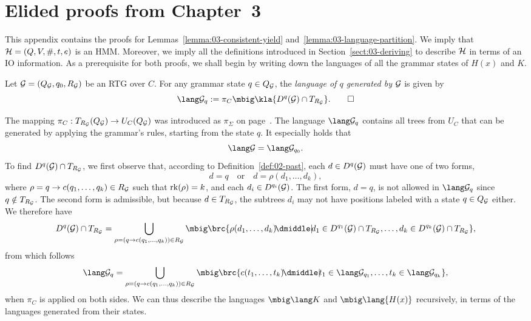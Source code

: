 \section{Elided proofs from Chapter~3}\label{sec:appendix-hk-proofs}

This appendix contains the proofs for Lemmas~\ref{lemma:03-consistent-yield}
and~\ref{lemma:03-language-partition}. We imply that $\mathcal H = (Q,V,\#,t,e)$ is an
HMM. Moreover, we imply all the definitions introduced in
Section~\ref{sect:03-deriving} to describe $\mathcal H$ in terms of an IO information.
As a prerequisite for both proofs, we shall begin by writing down the languages
of all the grammar states of $H(x)$ and $K$.

\begin{definition}
 Let $\mathcal G = (Q_\mathcal G,q_0,R_\mathcal G)$ be an RTG over $C$. For any grammar state $q\in
 Q_\mathcal G$, the \emph{language of $q$ generated by $\mathcal G$} is given by
 \[
  \lang\ug_q := \pi_C\mbig\kla{D^q(\ug)\cap T_{R_\ug}}.
  \qedhere
 \]
\end{definition}

The mapping $\pi_C:T_{R_\mathcal G}(Q_\mathcal G)\to U_C(Q_\mathcal G)$ was introduced as $\pi_\Sigma$ on
page~\pageref{def:02-pi-sigma}. The language $\lang\ug_q$ contains all trees
from $U_C$ that can be generated by applying the grammar's rules, starting from
the state $q$. It especially holds that
\begin{equation}\label{eq:a1}
 \lang\ug = \lang\ug_{q_0}.
\end{equation}
To find $D^q(\mathcal G)\cap T_{R_\mathcal G}$, we first observe that, according to
Definition~\ref{def:02-past}, each $d\in D^q(\mathcal G)$ must have one of two forms,
\[
 d = q \quad\text{or}\quad d = \rho(d_1,\ldots,d_k),
\]
where $\rho=q\to c(q_1,\ldots,q_k)\in R_\mathcal G$ such that $\operatorname{rk}(\rho) = k$, and
each $d_i\in D^{q_i}(\mathcal G)$. The first form, $d = q$, is not allowed in
$\lang\ug_q$ since $q\notin T_{R_\mathcal G}$. The second form is admissible, but
because $d\in T_{R_\mathcal G}$, the subtrees $d_i$ may not have positions labeled with
a state $q\in Q_\mathcal G$ either. We therefore have
\[
 D^q(\ug)\cap T_{R_\ug} = \bigcup_{\rho=(q\to c(q_1,\ldots,q_k))\in R_\ug}
 \mbig\brc{\rho(d_1,\ldots,d_k) \!\dmiddle|\! d_1\in D^{q_1}(\ug)\cap T_{R_\ug},\ldots, d_k\in D^{q_k}(\ug)\cap T_{R_\ug}},
\]
from which follows
\begin{equation}
 \label{eq:a2}
 \lang\ug_q = \bigcup_{\rho=(q\to c(q_1,\ldots,q_k))\in R_\ug}
 \mbig\brc{c(t_1,\ldots,t_k) \!\dmiddle|\! t_1\in\lang\ug_{q_1},\ldots, t_k\in\lang\ug_{q_k}},
\end{equation}
when $\pi_C$ is applied on both sides. We can thus describe the languages
$\mbig\lang K$ and $\mbig\lang{H(x)}$ recursively, in terms of the languages
generated from their states.

